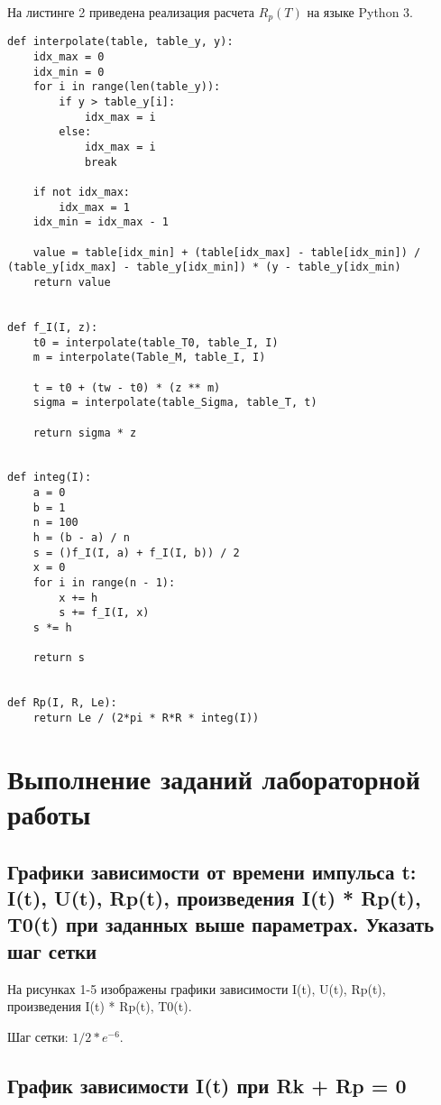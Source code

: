 На листинге 2 приведена реализация расчета $R_p(T)$ на языке Python 3.

\begin{lstlisting}[caption=Методы Рунге-Кутта четвертого порядка]
def interpolate(table, table_y, y):
	idx_max = 0
	idx_min = 0
	for i in range(len(table_y)):
		if y > table_y[i]:
			idx_max = i
		else:
			idx_max = i
			break
	
	if not idx_max:
		idx_max = 1
	idx_min = idx_max - 1
	
	value = table[idx_min] + (table[idx_max] - table[idx_min]) / (table_y[idx_max] - table_y[idx_min]) * (y - table_y[idx_min)
	return value


def f_I(I, z):
	t0 = interpolate(table_T0, table_I, I)
	m = interpolate(Table_M, table_I, I)
	
	t = t0 + (tw - t0) * (z ** m)
	sigma = interpolate(table_Sigma, table_T, t)
	
	return sigma * z
	

def integ(I):
	a = 0
	b = 1
	n = 100
	h = (b - a) / n
	s = ()f_I(I, a) + f_I(I, b)) / 2
	x = 0
	for i in range(n - 1):
		x += h
		s += f_I(I, x)
	s *= h
	
	return s
	
	
def Rp(I, R, Le):
	return Le / (2*pi * R*R * integ(I)) 
\end{lstlisting}




\section*{Выполнение заданий лабораторной работы}

\subsection*{Графики зависимости от времени импульса t: I(t), U(t), Rp(t), произведения I(t) * Rp(t), T0(t) при заданных выше параметрах. Указать шаг сетки}


На рисунках 1-5 изображены графики зависимости I(t), U(t), Rp(t), произведения I(t) * Rp(t), T0(t).

Шаг сетки: $1/2 * e^{-6}$.



\subsection*{График зависимости I(t) при Rk + Rp = 0}


